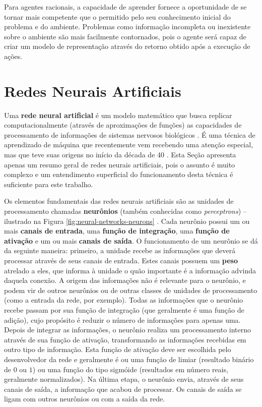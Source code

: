 Para agentes racionais, a capacidade de aprender fornece a oportunidade de se
tornar mais competente que o permitido pelo seu conhecimento inicial do problema
e do ambiente. Problemas como informação incompleta ou inexistente sobre o
ambiente são mais facilmente contornados, pois o agente será capaz de criar um
modelo de representação através do retorno obtido após a execução de ações.


\section{\label{section:neural-networks}Redes Neurais Artificiais}
Uma \textbf{rede neural artificial} é um modelo matemático que busca replicar
computacionalmente (através de aproximações de funções) as capacidades de
processamento de informações de sistemas nervosos biológicos \cite[Cap.
1]{Rojas:1996:NNS:235222}. É uma técnica de aprendizado de máquina que
recentemente vem recebendo uma atenção especial, mas que teve suas origens no
início da década de 40 \cite[Cap. 18]{RussellNorvig200912}. Esta Seção apresenta
apenas um resumo geral de redes neurais artificiais, pois o assunto é muito
complexo e um entendimento superficial do funcionamento desta técnica é
suficiente para este trabalho.

Os elementos fundamentais das redes neurais artificiais são as unidades de
processamento chamadas \textbf{neurônios} (também conhecidas como
\textit{perceptrons}) -- ilustrado na Figura \ref{fig:neural-networks-neurons}
\cite[Cap. 3]{Rojas:1996:NNS:235222}.  Cada neurônio possui um ou mais
\textbf{canais de entrada}, uma \textbf{função de integração}, uma
\textbf{função de ativação} e um ou mais \textbf{canais de saída}. O
funcionamento de um neurônio se dá da seguinte maneira: primeiro, a unidade
recebe as informações que deverá processar através de seus canais de entrada.
Estes canais possuem um \textbf{peso} atrelado a eles, que informa à unidade o
quão importante é a informação advinda daquela conexão. A origem das informações
não é relevante para o neurônio, e podem vir de outros neurônios ou de outras
classes de unidades de processamento (como a entrada da rede, por exemplo).
Todas as informações que o neurônio recebe passam por sua função de integração
(que geralmente é uma função de adição), cujo propósito é reduzir o número de
informações para apenas uma.  Depois de integrar as informações, o neurônio
realiza um processamento interno através de sua função de ativação,
transformando as informações recebidas em outro tipo de informação. Esta função
de ativação deve ser escolhida pelo desenvolvedor da rede e geralmente é ou uma
função de limiar (resultado binário de $0$ ou $1$) ou uma função do tipo
sigmóide (resultados em número reais, geralmente normalizados). Na última etapa,
o neurônio envia, através de seus canais de saída, a informação que acabou de
processar. Os canais de saída se ligam com outros neurônios ou com a saída da
rede.

